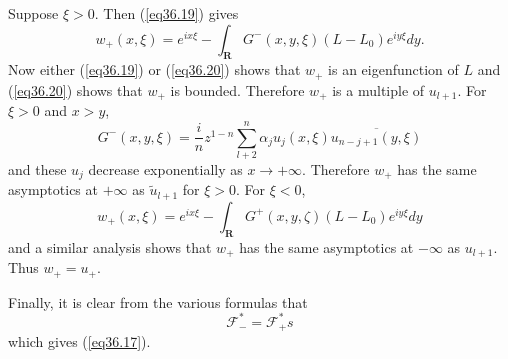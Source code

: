 \documentclass{surv-l}
\theoremstyle{plain}
\theoremstyle{definition}
\numberwithin{equation}{chapter}
\begin{document}
Suppose $\xi>0$. Then (\ref{eq36.19}) gives
\begin{equation}\label{eq36.20}
w_{+}(x,\xi)=e^{ix\xi}-\int_{\mathbf{R}}G^{-}(x, y, \xi)(L-L_{0})e^{iy\xi}dy.
\end{equation}
Now either (\ref{eq36.19}) or (\ref{eq36.20}) shows that $w_{+}$ is an eigenfunction of $L$ and (\ref{eq36.20}) shows that $w_{+}$ is bounded. Therefore $w_{+}$ is a multiple of $u_{l+1}$. For $\xi>0$ and $x>y$,
\begin{equation*}
G^{-}(x, y,\xi)=\frac{i}{n}z^{1-n}\sum_{l+2}^{n}\alpha_{j}u_{j}(x, \xi)\overline{u_{n-j+1}(y,\xi)}
\end{equation*}
and these $u_{j}$ decrease exponentially as $x\rightarrow +\infty$. Therefore $w_{+}$ has the same asymptotics at $+\infty$ as $\tilde{u}_{l+1}$ for $\xi>0$. For $\xi<0$,
\begin{equation*}
w_{+}(x, \xi)=e^{ix\xi}-\int_{\mathbf{R}}G^{+}(x, y,\zeta)(L-L_{0})e^{iy\xi}dy
\end{equation*}
and a similar analysis shows that $w_{+}$ has the same asymptotics at $-\infty$ as $u_{l+1}$. Thus $w_{+}=u_{+}$.

Finally, it is clear from the various formulas that
\begin{equation*}
\mathscr{F}_{-}^{*}=\mathscr{F}_{+}^{*}s
\end{equation*}
which gives (\ref{eq36.17}).
\end{document}
